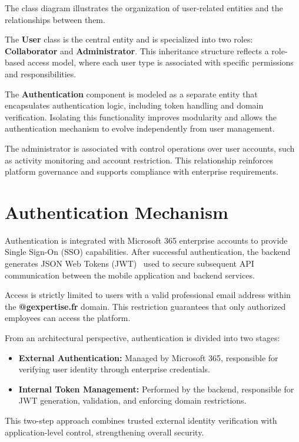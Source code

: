 The class diagram illustrates the organization of user-related entities and the relationships between them.

The \textbf{User} class is the central entity and is specialized into two roles: \textbf{Collaborator} and \textbf{Administrator}. This inheritance structure reflects a role-based access model, where each user type is associated with specific permissions and responsibilities.

The \textbf{Authentication} component is modeled as a separate entity that encapsulates authentication logic, including token handling and domain verification. Isolating this functionality improves modularity and allows the authentication mechanism to evolve independently from user management.

The administrator is associated with control operations over user accounts, such as activity monitoring and account restriction. This relationship reinforces platform governance and supports compliance with enterprise requirements.

\section{Authentication Mechanism}

Authentication is integrated with Microsoft 365 enterprise accounts to provide Single Sign-On (SSO) capabilities. After successful authentication, the backend generates JSON Web Tokens (JWT)~\cite{jwt} used to secure subsequent API communication between the mobile application and backend services.

Access is strictly limited to users with a valid professional email address within the \textbf{@gexpertise.fr} domain. This restriction guarantees that only authorized employees can access the platform.

From an architectural perspective, authentication is divided into two stages:

\begin{itemize}
    \item \textbf{External Authentication:} Managed by Microsoft 365, responsible for verifying user identity through enterprise credentials.
    \item \textbf{Internal Token Management:} Performed by the backend, responsible for JWT generation, validation, and enforcing domain restrictions.
\end{itemize}

This two-step approach combines trusted external identity verification with application-level control, strengthening overall security.

